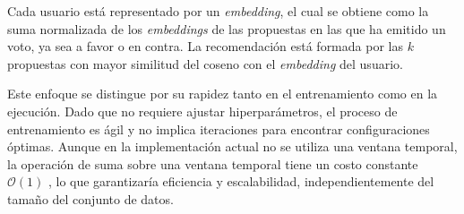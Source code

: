 
Cada usuario está representado por un \textit{embedding}, el cual se obtiene como la suma normalizada de los \textit{embeddings} de las propuestas en las que ha emitido un voto, ya sea a favor o en contra. La recomendación está formada por las $k$ propuestas con mayor similitud del coseno con el \textit{embedding} del usuario.

Este enfoque se distingue por su rapidez tanto en el entrenamiento como en la ejecución. Dado que no requiere ajustar hiperparámetros, el proceso de entrenamiento es ágil y no implica iteraciones para encontrar configuraciones óptimas. Aunque en la implementación actual no se utiliza una ventana temporal, la operación de suma sobre una ventana temporal tiene un costo constante $\mathcal{O}(1)$ \cite{hirzel_sliding-window_2017}, lo que garantizaría eficiencia y escalabilidad, independientemente del tamaño del conjunto de datos.

